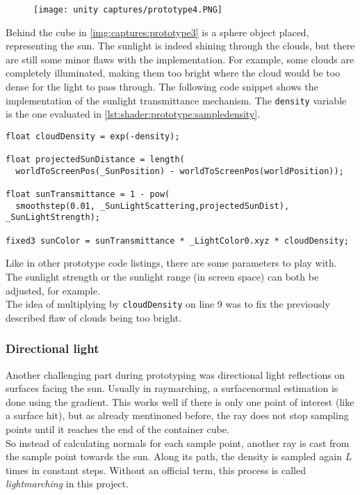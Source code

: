 \begin{figure}[H]
    \centering
    \texttt{[image: unity captures/prototype4.PNG]}
    \label{img:captures:prototype3}
\end{figure}

\noindent
Behind the cube in \autoref{img:captures:prototype3} is a sphere object placed, representing the sun. The sunlight is indeed shining through the clouds, but there are still some minor flaws with the implementation.
For example, some clouds are completely illuminated, making them too bright where the cloud would be too dense for the light to pass through.
\emptyline
The following code snippet shows the implementation of the sunlight transmittance mechanism. The \lstinline[language=HLSL]{density} variable is the one evaluated in \autoref{lst:shader:prototype:sampledensity}.

\begin{lstlisting}[language=HLSL, caption=Implementation of a sunlight transmittance mechanism., label=lst:shader:prototype:sunlighttransmittance]
float cloudDensity = exp(-density);

float projectedSunDistance = length(
  worldToScreenPos(_SunPosition) - worldToScreenPos(worldPosition));

float sunTransmittance = 1 - pow(
  smoothstep(0.01, _SunLightScattering,projectedSunDist), _SunLightStrength);

fixed3 sunColor = sunTransmittance * _LightColor0.xyz * cloudDensity;
\end{lstlisting}

\noindent
Like in other prototype code listings, there are some \gls{parameters} to play with. The sunlight strength or the sunlight range (in screen space) can both be adjusted, for example.
\\
The idea of multiplying by \lstinline[language=HLSL]{cloudDensity} on line 9 was to fix the previously described flaw of clouds being too bright. 

\clearpage
\subsubsection{Directional light}
Another challenging part during prototyping was directional light reflections on surfaces facing the sun. Usually in \gls{raymarching}, a \gls{surfacenormal} estimation is done using the gradient.
This works well if there is only one point of interest (like a surface hit), but as already mentinoned before, the ray does not stop sampling points until it reaches the end of the container cube.
\\
So instead of calculating normals for each sample point, another ray is cast from the sample point towards the sun.
Along its path, the density is sampled again $L$ times in constant steps. Without an official term, this process is called \textit{\gls{lightmarching}} in this project.

